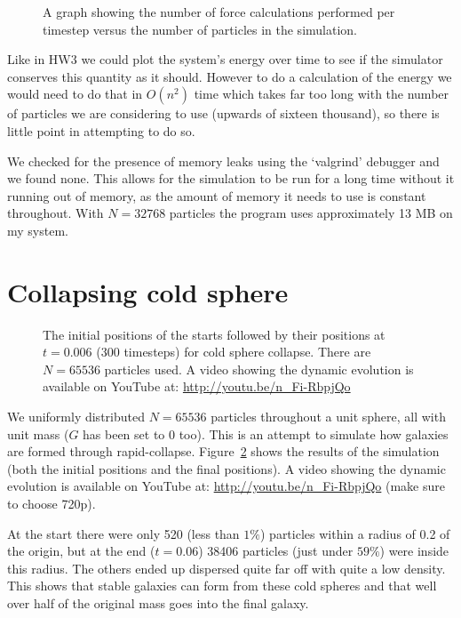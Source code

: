 \documentclass[11pt]{article}
\begin{document}
\begin{figure}
\begin{center}

\caption{A graph showing the number of force calculations performed per timestep versus the number of particles in the simulation.}
\label{scaling}
\end{center}
\end{figure}

Like in HW3 we could plot the system's energy over time to see if the simulator conserves this quantity as it should.
However to do a calculation of the energy we would need to do that in $O(n^2)$ time which takes far too long with the number of particles we are considering to use (upwards of sixteen thousand), so there is little point in attempting to do so.

We checked for the presence of memory leaks using the `valgrind' debugger and we found none.
This allows for the simulation to be run for a long time without it running out of memory, as the amount of memory it needs to use is constant throughout.
With $N=32768$ particles the program uses approximately 13 MB on my system.

\section{Collapsing cold sphere}
\begin{figure}
  \centering
  \caption{The initial positions of the starts followed by their positions at $t=0.006$ (300 timesteps) for cold sphere collapse. There are $N=65536$ particles used. A video showing the dynamic evolution is available on YouTube at: \url{http://youtu.be/n_Fi-RbpjQo}}

  \label{coldsphere}
\end{figure}

We uniformly distributed $N=65536$ particles throughout a unit sphere, all with unit mass ($G$ has been set to 0 too).
This is an attempt to simulate how galaxies are formed through rapid-collapse.
Figure~\ref{coldsphere} shows the results of the simulation (both the initial positions and the final positions).
A video showing the dynamic evolution is available on YouTube at: \url{http://youtu.be/n_Fi-RbpjQo} (make sure to choose 720p).


At the start there were only 520 (less than $1\%$) particles within a radius of 0.2 of the origin, but at the end ($t=0.06$) 38406 particles (just under $59\%$) were inside this radius.
The others ended up dispersed quite far off with quite a low density.
This shows that stable galaxies can form from these cold spheres and that well over half of the original mass goes into the final galaxy.
\end{document}
